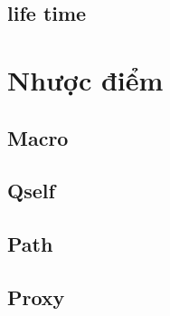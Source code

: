 \subsection{life time}

\section{Nhược điểm}

\subsection{Macro}

\subsection{Qself}

\subsection{Path}

\subsection{Proxy}